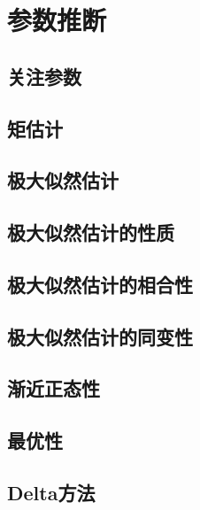 \chapter{参数推断}

\section{关注参数}

\pending

\section{矩估计}

\pending

\section{极大似然估计}

\pending

\section{极大似然估计的性质}

\pending

\section{极大似然估计的相合性}

\pending

\section{极大似然估计的同变性}

\pending

\section{渐近正态性}

\pending

\section{最优性}

\pending

\section{Delta方法}

